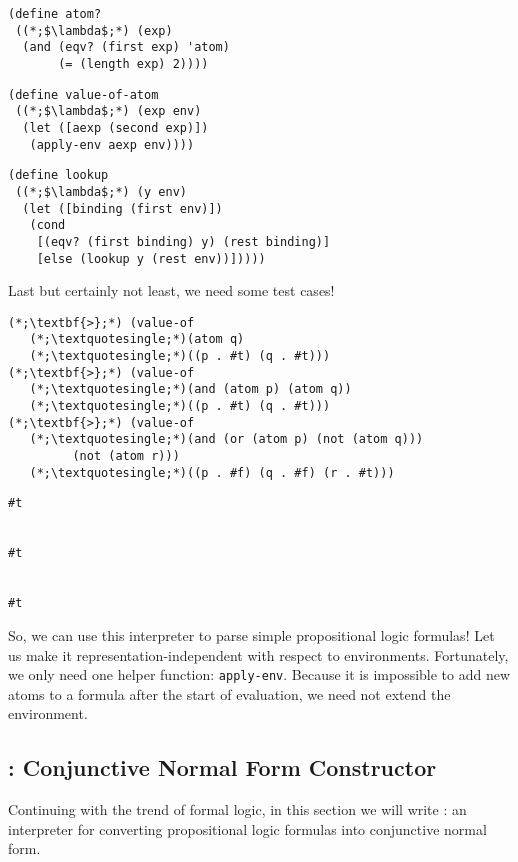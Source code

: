 \begin{clrr}[]{}
\begin{lstlisting}[language=MyScheme]
(define atom?
 ((*;$\lambda$;*) (exp)
  (and (eqv? (first exp) 'atom)
       (= (length exp) 2))))
\end{lstlisting}
\tcblower
\begin{lstlisting}[language=MyNLNScheme]
(define value-of-atom
 ((*;$\lambda$;*) (exp env)
  (let ([aexp (second exp)])
   (apply-env aexp env))))
\end{lstlisting}
\end{clrr}

\begin{cl}[]{}
\begin{lstlisting}[language=MyScheme]
(define lookup
 ((*;$\lambda$;*) (y env)
  (let ([binding (first env)])
   (cond
    [(eqv? (first binding) y) (rest binding)]
    [else (lookup y (rest env))]))))
\end{lstlisting}\end{cl}

\noindent Last but certainly not least, we need some test cases!

\begin{cloast}[]{}
\begin{lstlisting}[language=MyNLNSOutput]
(*;\textbf{>};*) (value-of 
   (*;\textquotesingle;*)(atom q) 
   (*;\textquotesingle;*)((p . #t) (q . #t)))
(*;\textbf{>};*) (value-of 
   (*;\textquotesingle;*)(and (atom p) (atom q)) 
   (*;\textquotesingle;*)((p . #t) (q . #t)))
(*;\textbf{>};*) (value-of 
   (*;\textquotesingle;*)(and (or (atom p) (not (atom q))) 
         (not (atom r))) 
   (*;\textquotesingle;*)((p . #f) (q . #f) (r . #t))) 
\end{lstlisting}
\tcblower
\begin{lstlisting}[language=MyOutput]
#t


#t


#t
\end{lstlisting}
\end{cloast}

So, we can use this interpreter to parse simple propositional logic formulas! Let us make it representation-independent with respect to environments. Fortunately, we only need one helper function: \texttt{apply-env}. Because it is impossible to add new atoms to a formula after the start of evaluation, we need not extend the environment.

\clearpage
\subsection*{: Conjunctive Normal Form Constructor}
Continuing with the trend of formal logic, in this section we will write : an interpreter for converting propositional logic formulas into conjunctive normal form.


